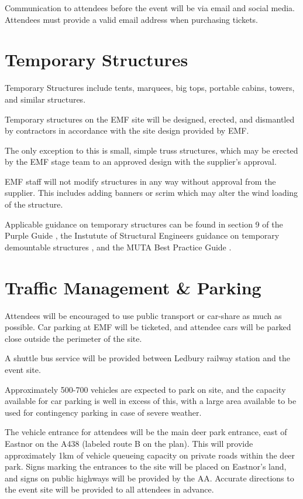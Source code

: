 Communication to attendees before the event will be via email and social
media. Attendees must provide a valid email address when purchasing tickets.

\section{Temporary Structures}
Temporary Structures include tents, marquees, big tops, portable cabins,
towers, and similar structures.

Temporary structures on the EMF site will be designed, erected, and dismantled
by contractors in accordance with the site design provided by EMF.

The only exception to this is small, simple truss structures, which may be erected
by the EMF stage team to an approved design with the supplier's approval.

EMF staff will not modify structures in any way without approval from the supplier.
This includes adding banners or scrim which may alter the wind loading of the
structure.

Applicable guidance on temporary structures can be found in
section 9 of the Purple Guide \cite{purpleguide}, the Instutute of Structural
Engineers guidance on temporary demountable structures \cite{istructe-tds}, and
the MUTA Best Practice Guide \cite{mutaguide}.

\section{Traffic Management \& Parking}

Attendees will be encouraged to use public transport or car-share as much as
possible. Car parking at EMF will be ticketed, and attendee cars will be
parked close outside the perimeter of the site.

A shuttle bus service will be provided between Ledbury railway station and the event
site.

Approximately 500-700 vehicles are expected to park on site, and the capacity
available for car parking is well in excess of this, with a large area available
to be used for contingency parking in case of severe weather.

The vehicle entrance for attendees will be the main deer park entrance, east of
Eastnor on the A438 (labeled route B on the plan). This will provide
approximately 1km of vehicle queueing capacity on private roads within the deer
park. Signs marking the entrances to the site will be placed on Eastnor's land, and
signs on public highways will be provided by the AA\@. Accurate directions to
the event site will be provided to all attendees in advance.

